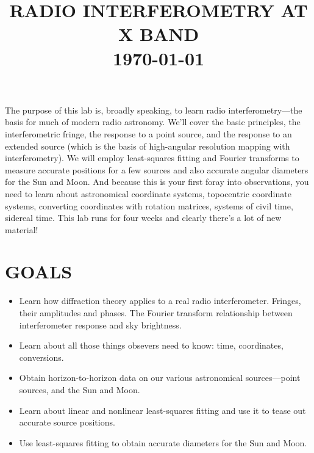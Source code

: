 \documentclass[11pt,preprint]{aastex}
\begin{document}
\def\simlt{\lower.5ex\hbox{$\; \buildrel < \over \sim \;$}}
\def\simgt{\lower.5ex\hbox{$\; \buildrel > \over \sim \;$}}


\title {RADIO INTERFEROMETRY AT X BAND \\ \today}

\tableofcontents

The purpose of this lab is, broadly speaking, to learn radio
interferometry---the basis for much of modern radio astronomy. We'll
cover the basic principles, the interferometric fringe, the response to
a point source, and the response to an extended source (which is the
basis of high-angular resolution mapping with interferometry). We will
employ least-squares fitting and Fourier transforms to measure accurate
positions for a few sources and also accurate angular diameters for the
Sun and Moon. And because this is your first foray into observations,
you need to learn about astronomical coordinate systems, topocentric
coordinate systems, converting coordinates with rotation matrices,
systems of civil time, sidereal time. This lab runs for four weeks and
clearly there's a lot of new material!

\section{GOALS}

\begin{itemize}

\item Learn how diffraction theory applies to a real radio
  interferometer. Fringes, their amplitudes and phases. The Fourier
  transform relationship between interferometer response and sky
  brightness. 

\item Learn about all those things obsevers need to know: time,
  coordinates, conversions.

\item Obtain horizon-to-horizon data on our various astronomical
  sources---point sources, and the Sun and Moon.

\item Learn about linear and nonlinear least-squares fitting and use it
  to tease out accurate source positions.

\item Use least-squares fitting to obtain accurate diameters for the Sun
  and Moon.

\end{itemize}
\end{document}
